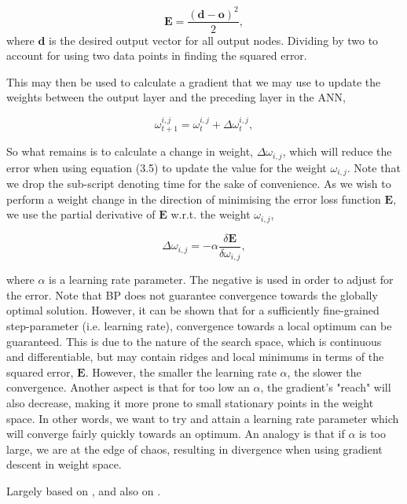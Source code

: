 \begin{equation}
    \textbf{E} = \frac{(\textbf{d} - \textbf{o})^2}{2},
\end{equation}
where $\textbf{d}$ is the desired output vector for all output nodes. Dividing by two to account for using two data points in finding the squared error.

This may then be used to calculate a gradient that we may use to update the weights between the output layer and the preceding layer in the ANN,

\begin{equation}
    \omega_{t+1}^{i,j} = \omega_{t}^{i,j} + \Delta \omega_{t}^{i,j},
\end{equation}

So what remains is to calculate a change in weight, $\Delta \omega_{i,j}$, which will reduce the error when using equation (3.5) to update the value for the weight $\omega_{i,j}$. Note that we drop the sub-script denoting time for the sake of convenience. As we wish to perform a weight change in the direction of minimising the error loss function $\textbf{E}$, we use the partial derivative of $\textbf{E}$ w.r.t. the weight $\omega_{i,j}$,

\begin{equation}
    \Delta \omega_{i,j} = -\alpha \frac{\delta \textbf{E}}{\delta \omega_{i,j}},
\end{equation}

where $\alpha$ is a learning rate parameter. The negative is used in order to adjust for the error. Note that BP does not guarantee convergence towards the globally optimal solution. However, it can be shown that for a sufficiently fine-grained step-parameter (i.e. learning rate), convergence towards a local optimum can be guaranteed. This is due to the nature of the search space, which is continuous and differentiable, but may contain ridges and local minimums in terms of the squared error, $\textbf{E}$. However, the smaller the learning rate $\alpha$, the slower the convergence. Another aspect is that for too low an $\alpha$, the gradient's "reach" will also decrease, making it more prone to small stationary points in the weight space. In other words, we want to try and attain a learning rate parameter which will converge fairly quickly towards an optimum. An analogy is that if $\alpha$ is too large, we are at the edge of chaos, resulting in divergence when using gradient descent in weight space.

Largely based on \cite{Rumelhart1986}, and also on \cite{Russell2009}.


